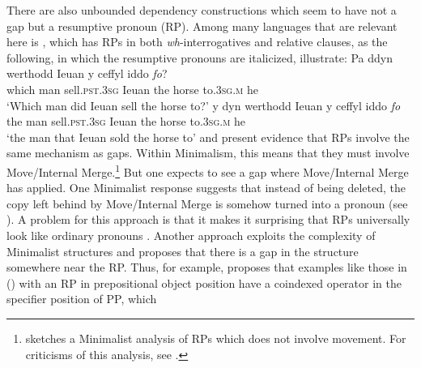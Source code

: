 \documentclass[output=paper,biblatex,babelshorthands,newtxmath,draftmode,colorlinks,citecolor=brown]{langscibook}
\begin{document}

There are also unbounded dependency constructions which seem to have not a gap but a resumptive pronoun (RP). Among many languages that are relevant here is , which has RPs in both \emph{wh}-interrogatives and relative clauses, as the following, in which the resumptive pronouns are italicized, illustrate:
\eal
\ex
\gll Pa	ddyn werthodd Ieuan y ceffyl iddo \emph{fo}?\\
     which man sell.\textsc{pst}.\textsc{3sg} Ieuan the horse to.\textsc{3sg.m} he\\
\glt`Which man did Ieuan sell the horse to?'
\ex 
\gll y dyn werthodd Ieuan y ceffyl iddo \emph{fo}\\
the man sell.\textsc{pst}.\textsc{3sg} Ieuan the horse to.\textsc{3sg.m} he\\
\glt`the man that Ieuan sold the horse to'
\zl
\largerpage[1]
\citet{Willis.2011} and \citet{Borsley.2010,Borsley2013a-u} present evidence that  RPs involve
the same mechanism as gaps. Within Minimalism, this means that they must involve Move/Internal
Merge.\footnote{%
  \citet{Rouveret2008a-u} 
sketches a Minimalist analysis of  RPs which does not involve movement. For
  criticisms of this analysis, see .
} But one expects to see a gap where Move/Internal Merge has applied. One Minimalist response
suggests that instead of being deleted, the copy left behind by Move/Internal Merge is somehow
turned into a pronoun (see \citealt[]{McCloskey.2006}). A problem for this approach is that it makes
it surprising that RPs universally look like ordinary pronouns \citep{McCloskey2002a-u}.
Another approach exploits the complexity of
Minimalist structures and proposes that there is a gap in the structure somewhere near the RP.
Thus, for example, \citet[]{Willis.2011} proposes that examples like those in () with an RP in
prepositional object position have a coindexed operator in the specifier position of PP, which
\end{document}
